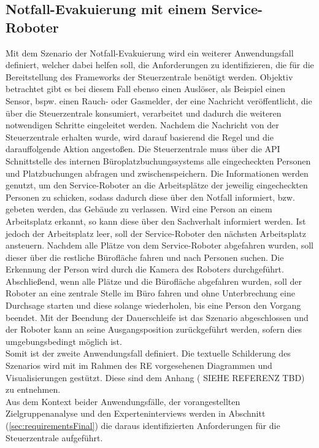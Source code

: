 \subsection{Notfall-Evakuierung mit einem Service-Roboter}
    Mit dem Szenario der Notfall-Evakuierung wird ein weiterer Anwendungsfall definiert, welcher dabei helfen soll, die 
    Anforderungen zu identifizieren, die für die Bereitstellung des Frameworks der Steuerzentrale benötigt werden.
    Objektiv betrachtet gibt es bei diesem Fall ebenso einen Auslöser, als Beispiel einen Sensor, bspw. einen Rauch- 
    oder Gasmelder, der eine Nachricht veröffentlicht, die über die Steuerzentrale konsumiert, verarbeitet und dadurch die 
    weiteren notwendigen Schritte eingeleitet werden. Nachdem die Nachricht von der Steuerzentrale erhalten wurde, wird 
    darauf basierend die Regel und die darauffolgende Aktion angestoßen. Die Steuerzentrale muss über die \acs{API} 
    Schnittstelle des internen Büroplatzbuchungssystems alle eingecheckten Personen und Platzbuchungen abfragen und 
    zwischenspeichern. Die Informationen werden genutzt, um den Service-Roboter an die Arbeitsplätze der jeweilig 
    eingecheckten Personen zu schicken, sodass dadurch diese über den Notfall informiert, bzw. gebeten werden, das 
    Gebäude zu verlassen. Wird eine Person an einem Arbeitsplatz erkannt, so kann diese über den Sachverhalt informiert 
    werden. Ist jedoch der Arbeitsplatz leer, soll der Service-Roboter den nächsten Arbeitsplatz ansteuern. Nachdem alle 
    Plätze von dem Service-Roboter abgefahren wurden, soll dieser über die restliche Bürofläche fahren und nach Personen 
    suchen. Die Erkennung der Person wird durch die Kamera des Roboters durchgeführt. Abschließend, wenn alle Plätze und die 
    Bürofläche abgefahren wurden, soll der Roboter an eine zentrale Stelle im Büro fahren und ohne Unterbrechung eine 
    Durchsage starten und diese solange wiederholen, bis eine Person den Vorgang beendet. Mit der Beendung der Dauerschleife 
    ist das Szenario abgeschlossen und der Roboter kann an seine Ausgangsposition zurückgeführt werden, sofern dies 
    umgebungsbedingt möglich ist.
    \\
    Somit ist der zweite Anwendungsfall definiert. Die textuelle Schilderung des Szenarios wird mit im Rahmen des \acs{RE} 
    vorgesehenen Diagrammen und Visualisierungen gestützt. Diese sind dem Anhang (%
    SIEHE REFERENZ TBD) zu entnehmen.
    \\
    \linebreak
    Aus dem Kontext beider Anwendungsfälle, der vorangestellten Zielgruppenanalyse und den Experteninterviews werden in Abschnitt 
    (\ref{sec:requirementsFinal}) die daraus identifizierten Anforderungen für die Steuerzentrale aufgeführt.

